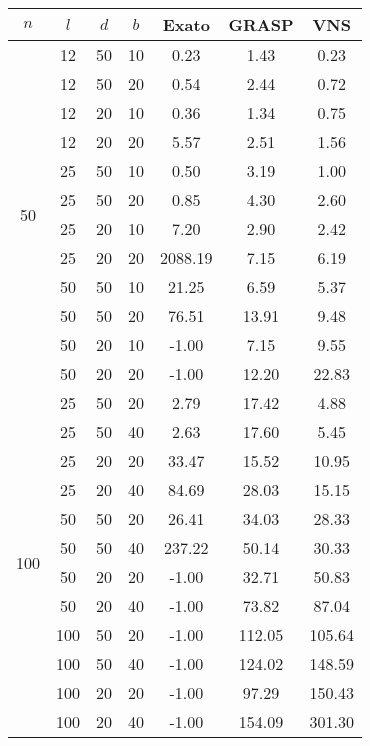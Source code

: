 \begin{tabular}{ |c|c|c|c||c c c| }
\hline
$ n $ & $ l $ & $ d $ & $ b $ & Exato & GRASP & VNS \\
\hline
\multirow{12}{*}{50} & 12 & 50 & 10 &   0.23 &   1.43 &   0.23 \\
& 12 & 50 & 20 &   0.54 &   2.44 &   0.72 \\
\cline{3-4}& 12 & 20 & 10 &   0.36 &   1.34 &   0.75 \\
& 12 & 20 & 20 &   5.57 &   2.51 &   1.56 \\
\cline{3-4}\cline{2-2}& 25 & 50 & 10 &   0.50 &   3.19 &   1.00 \\
& 25 & 50 & 20 &   0.85 &   4.30 &   2.60 \\
\cline{3-4}& 25 & 20 & 10 &   7.20 &   2.90 &   2.42 \\
& 25 & 20 & 20 & 2088.19 &   7.15 &   6.19 \\
\cline{3-4}\cline{2-2}& 50 & 50 & 10 &  21.25 &   6.59 &   5.37 \\
& 50 & 50 & 20 &  76.51 &  13.91 &   9.48 \\
\cline{3-4}& 50 & 20 & 10 &  -1.00 &   7.15 &   9.55 \\
& 50 & 20 & 20 &  -1.00 &  12.20 &  22.83 \\
\cline{3-4}\cline{2-2}\cline{1-1}\multirow{12}{*}{100} & 25 & 50 & 20 &   2.79 &  17.42 &   4.88 \\
& 25 & 50 & 40 &   2.63 &  17.60 &   5.45 \\
\cline{3-4}& 25 & 20 & 20 &  33.47 &  15.52 &  10.95 \\
& 25 & 20 & 40 &  84.69 &  28.03 &  15.15 \\
\cline{3-4}\cline{2-2}& 50 & 50 & 20 &  26.41 &  34.03 &  28.33 \\
& 50 & 50 & 40 & 237.22 &  50.14 &  30.33 \\
\cline{3-4}& 50 & 20 & 20 &  -1.00 &  32.71 &  50.83 \\
& 50 & 20 & 40 &  -1.00 &  73.82 &  87.04 \\
\cline{3-4}\cline{2-2}& 100 & 50 & 20 &  -1.00 & 112.05 & 105.64 \\
& 100 & 50 & 40 &  -1.00 & 124.02 & 148.59 \\
\cline{3-4}& 100 & 20 & 20 &  -1.00 &  97.29 & 150.43 \\
& 100 & 20 & 40 &  -1.00 & 154.09 & 301.30 \\
\cline{3-4}\cline{2-2}\cline{1-1}\hline
\end{tabular}
